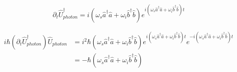 \documentclass[aps,pra,showpacs,amsmath,amssymb,nofootinbib,longbibliography,superscriptaddress
]{revtex4-1}
\theoremstyle{definition}
\theoremstyle{remark}
\newcommand{\0}{\hat{0}}
\begin{document}
\begin{equation}
    \partial_t \hat{U}_{photon}^{\dagger} =
    i(\omega_s \hat{a}^{\dagger} \hat{a} +
    \omega_i \hat{b}^{\dagger} \hat{b}) e^{i(\omega_s \hat{a}^{\dagger} \hat{a} +
    \omega_i \hat{b}^{\dagger} \hat{b})t}\nonumber
\end{equation}

\begin{align}
    i \hbar (\partial_t \hat{U}_{photon}^{\dagger}) \hat{U}_{photon}
    &=
    i^2 \hbar (\omega_s \hat{a}^{\dagger} \hat{a} +
    \omega_i \hat{b}^{\dagger} \hat{b}) e^{i(\omega_s \hat{a}^{\dagger} \hat{a} +
    \omega_i \hat{b}^{\dagger} \hat{b})t} e^{-i(\omega_s \hat{a}^{\dagger} \hat{a} +
    \omega_i \hat{b}^{\dagger} \hat{b})t}\nonumber\\
    &=
    -\hbar (\omega_s \hat{a}^{\dagger} \hat{a} + \omega_i \hat{b}^{\dagger} \hat{b})
\end{align}
\end{document}
